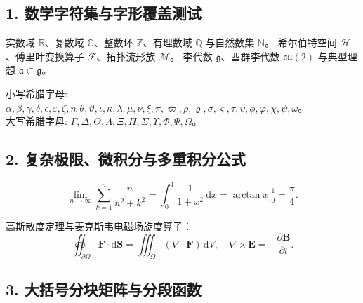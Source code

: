 
\subsection*{1. 数学字符集与字形覆盖测试}

实数域 $\mathbb{R}$、复数域 $\mathbb{C}$、整数环 $\mathbb{Z}$、有理数域 $\mathbb{Q}$ 与自然数集 $\mathbb{N}$。
希尔伯特空间 $\mathcal{H}$、傅里叶变换算子 $\mathcal{F}$、拓扑流形族 $\mathcal{M}$。
李代数 $\mathfrak{g}$、酉群李代数 $\mathfrak{su}(2)$ 与典型理想 $\mathfrak{a} \subset \mathfrak{g}$。

小写希腊字母: $\alpha, \beta, \gamma, \delta, \epsilon, \varepsilon, \zeta, \eta, \theta, \vartheta, \iota, \kappa, \lambda, \mu, \nu, \xi, \pi, \varpi, \rho, \varrho, \sigma, \varsigma, \tau, \upsilon, \phi, \varphi, \chi, \psi, \omega$。\\
大写希腊字母: $\Gamma, \Delta, \Theta, \Lambda, \Xi, \Pi, \Sigma, \Upsilon, \Phi, \Psi, \Omega$。

\subsection*{2. 复杂极限、微积分与多重积分公式}

\begin{equation}
  \lim_{n \to \infty} \sum_{k=1}^n \frac{n}{n^2 + k^2} = \int_0^1 \frac{1}{1 + x^2} \,\mathrm{d}x = \left. \arctan x \right|_0^1 = \frac{\pi}{4}.
\end{equation}

高斯散度定理与麦克斯韦电磁场旋度算子：
\begin{equation}
  \oiint_{\partial \Omega} \mathbf{F} \cdot \mathrm{d}\mathbf{S} = \iiint_{\Omega} (\nabla \cdot \mathbf{F}) \,\mathrm{d}V, \quad \nabla \times \mathbf{E} = -\frac{\partial \mathbf{B}}{\partial t}.
\end{equation}

\subsection*{3. 大括号分块矩阵与分段函数}

